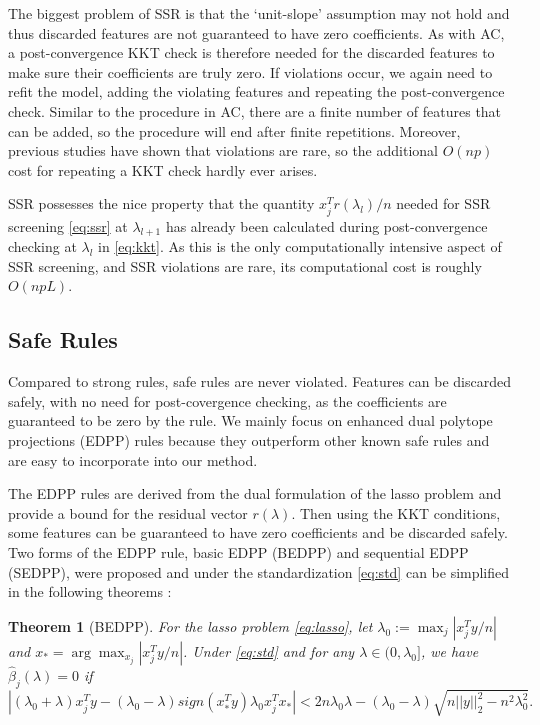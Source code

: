 \documentclass[]{interact}
\theoremstyle{plain}%
\newtheorem{theorem}{Theorem}[section]
\theoremstyle{definition}
\theoremstyle{remark}
\newcommand{\quotes}[1]{`#1'}
\begin{document}
The biggest problem of SSR is that the \quotes{unit-slope} assumption may not hold and thus discarded features are not guaranteed to have zero coefficients. As with AC, a post-convergence KKT check is therefore needed for the discarded features to make sure their coefficients are truly zero. If violations occur, we again need to refit the model, adding the violating features and repeating the post-convergence check. Similar to the procedure in AC, there are a finite number of features that can be added, so the procedure will end after finite repetitions. Moreover, previous studies have shown that violations are rare, so the additional $O(np)$ cost for repeating a KKT check hardly ever arises.

SSR possesses the nice property that the quantity $x_j^Tr(\lambda_l)/n$ needed for SSR screening \eqref{eq:ssr} at $\lambda_{l+1}$ has already been calculated during post-convergence checking at $\lambda_l$ in \eqref{eq:kkt}. As this is the only computationally intensive aspect of SSR screening, and SSR violations are rare, its computational cost is roughly $O(npL)$.

\subsection{Safe Rules}
\label{sec:safe}

Compared to strong rules, safe rules are never violated. Features can be discarded safely, with no need for post-covergence checking, as the coefficients are guaranteed to be zero by the rule. We mainly focus on enhanced dual polytope projections (EDPP) rules\citep{wang2013lasso} because they outperform other known safe rules and are easy to incorporate into our method.

The EDPP rules are derived from the dual formulation of the lasso problem and provide a bound for the residual vector $r(\lambda)$. Then using the KKT conditions, some features can be guaranteed to have zero coefficients and be discarded safely. Two forms of the EDPP rule, basic EDPP (BEDPP) and sequential EDPP (SEDPP)\citep{wang2013lasso}, were proposed and under the standardization \eqref{eq:std} can be simplified in the following theorems \citep{Zeng2021}:

\begin{theorem}[BEDPP]
    For the lasso problem \eqref{eq:lasso}, let $\lambda_0:=\max_j|x_j^Ty/n|$ and $x_*=\arg \max_{x_j}|x_j^Ty/n|$. Under \eqref{eq:std} and for any $\lambda\in(0,\lambda_0]$, we have $\hat{\beta}_j(\lambda)=0$ if
    \begin{equation}
        \label{eq:bedpp}
        |(\lambda_0+\lambda)x_j^Ty-(\lambda_0-\lambda)sign(x_*^Ty)\lambda_0x_j^Tx_*|<2n\lambda_0\lambda-(\lambda_0-\lambda)\sqrt{n||y||_2^2-n^2\lambda_0^2}.
    \end{equation}
\end{theorem}
\end{document}
